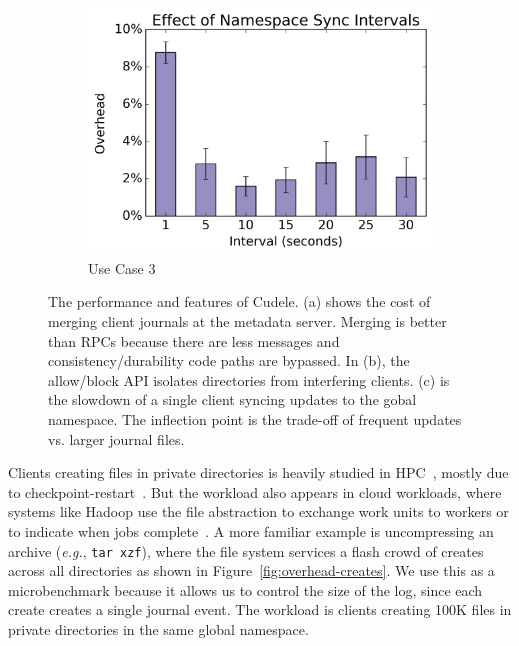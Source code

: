 \begin{figure}[t]
\begin{subfigure}[b]{.3\linewidth}
      \includegraphics[width=1.0\linewidth]{graphs/slowdown-sync.png}
      \caption{Use Case 3}
      \label{fig:slowdown-sync}
  \end{subfigure}
\caption{The performance and features of Cudele. (a) shows the cost of
merging client journals at the metadata server. Merging is better than RPCs
because there are less messages and consistency/durability code paths are
bypassed. In (b), the allow/block API isolates directories from interfering
clients. (c) is the slowdown of a single client syncing updates to the gobal
namespace. The inflection point is the trade-off of frequent updates vs. larger
journal files.\label{fig:use-cases}}
\end{figure}




Clients creating files in private directories is heavily studied in
HPC~\cite{weil:sc2004-dyn-metadata, ren:sc2014-indexfs, patil:fast2011-giga,
zheng:pdsw2014-batchfs, sevilla:sc15-mantle}, mostly due to
checkpoint-restart~\cite{bent_plfs_2009}.  But the workload also appears in
cloud workloads, where systems like Hadoop use the file abstraction to exchange
work units to workers or to indicate when jobs
complete~\cite{shvachko:login2012-hdfs-scalability}. A more familiar example is
uncompressing an archive ({\it e.g.}, \texttt{tar xzf}), where the file system
services a flash crowd of creates across all directories as shown in
Figure~\ref{fig:overhead-creates}.  We use this as a microbenchmark because it
allows us to control the size of the log, since each create creates a single
journal event. The workload is clients creating 100K files in private
directories in the same global namespace.

